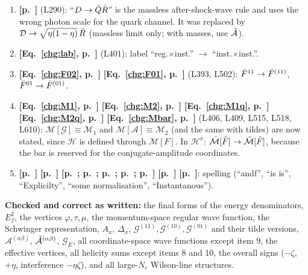 \documentclass[9pt]{article}
\numberwithin{equation}{section}
\begin{document}
\begin{enumerate}
    \item \textbf{[p.~\pageref{chg:Drule}]} (L290): ``$D\rightarrow\Tilde{Q}\Tilde{R}$'' is the massless after-shock-wave rule and uses the wrong photon scale for the quark channel. It was replaced by $\mathcal{D}\rightarrow\sqrt{\eta(1-\eta)}\,\Tilde{R}$ (massless limit only; with masses, use $\Tilde{\mathcal{A}}$).
    \item \textbf{[Eq.~\eqref{chg:lab}, p.~\pageref{chg:lab}]} (L401): label ``reg.$\times$inst.'' $\rightarrow$ ``inst.$\times$inst.''.
    \item \textbf{[Eq.~\eqref{chg:F02}, p.~\pageref{chg:F02}]} \textbf{[Eq.~\eqref{chg:F01}, p.~\pageref{chg:F01}]} (L393, L502): $\Bar{F}^{11}\rightarrow\Bar{F}^{(11)}$, $\Bar{F}^{01}\rightarrow\Bar{F}^{(01)}$.
    \item \textbf{[Eq.~\eqref{chg:M1}, p.~\pageref{chg:M1}]} \textbf{[Eq.~\eqref{chg:M2}, p.~\pageref{chg:M2}]} \textbf{[Eq.~\eqref{chg:M1q}, p.~\pageref{chg:M1q}]} \textbf{[Eq.~\eqref{chg:M2q}, p.~\pageref{chg:M2q}]} \textbf{[Eq.~\eqref{chg:Mbar}, p.~\pageref{chg:Mbar}]} (L406, L409, L515, L518, L610): $\mathcal{M}[\mathcal{G}]\equiv\mathcal{M}_{1}$ and $\mathcal{M}[\mathcal{A}]\equiv\mathcal{M}_{2}$ (and the same with tildes) are now stated, since $\mathcal{H}$ is defined through $\mathcal{M}[F]$. In $\mathcal{H}^{x}$: $\Bar{\mathcal{M}}[\Tilde{F}]\rightarrow\Tilde{\mathcal{M}}[\Tilde{F}]$, because the bar is reserved for the conjugate-amplitude coordinates.
    \item \textbf{[p.~\pageref{chg:ty1}]} \textbf{[p.~\pageref{chg:ty2}]} \textbf{[p.~\pageref{chg:ty3a}; p.~\pageref{chg:ty3b}; p.~\pageref{chg:ty3c}; p.~\pageref{chg:ty3d}; p.~\pageref{chg:ty3e}]} \textbf{[p.~\pageref{chg:ty4}]} \textbf{[p.~\pageref{chg:ty5}]}: spelling (``andf'', ``is is'', ``Explicilty'', ``some normalisation'', ``Instantanous'').
\end{enumerate}
\noindent\textbf{Checked and correct as written:} the final forms of the energy denominators, $E^{2}_{f}$, the vertices $\varphi,\tau,\mu$, the momentum-space regular wave function, the Schwinger representation, $A_{x}$, $\Delta_{x}$, $\mathcal{G}^{(11)},\mathcal{G}^{(10)},\mathcal{G}^{(01)}$ and their tilde versions, $\mathcal{A}^{(\alpha\beta)}$, $\Tilde{\mathcal{A}}^{(\alpha\beta)}$, $\mathcal{G}_{E}$, all coordinate-space wave functions except item 9, the effective vertices, all helicity sums except items 8 and 10, the overall signs ($-\zeta$, $+\eta$, interference $-\eta\zeta$), and all large-$N_{c}$ Wilson-line structures.
\end{document}
